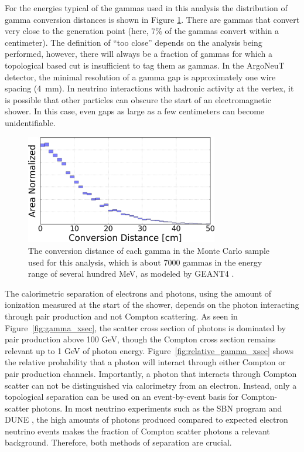 For the energies typical of the gammas used in this analysis the distribution of gamma conversion distances is shown in Figure \ref{fig:photon_conversion_dist}.  There are gammas that convert very close to the generation point (here, 7\% of the gammas convert within a centimeter).  The definition of ``too close'' depends on the analysis being performed, however, there will always be a fraction of gammas for which a topological based cut is insufficient to tag them as gammas.  In the ArgoNeuT detector, the minimal resolution of a gamma gap is approximately one wire spacing (4~mm). In neutrino interactions with hadronic activity at the vertex, it is possible that other particles can obscure the start of an electromagnetic shower.  In this case, even gaps as large as a few centimeters can become unidentifiable.

\begin{figure}[h!]
  \centering
  \includegraphics[width=0.75\textwidth]{emshower_figures/photon_conversion_dist_trimmed.png}
  \caption[Photon Conversion Distance]{The conversion distance of each gamma in the Monte Carlo sample used for this analysis, which is about 7000 gammas in the energy range of several hundred MeV, as modeled by GEANT4 \cite{Agostinelli:2002hh}.}
  \label{fig:photon_conversion_dist}
\end{figure}

The calorimetric separation of electrons and photons, using the amount of ionization measured at the start of the shower, depends on the photon interacting through pair production and not Compton scattering.  As seen in Figure~\ref{fig:gamma_xsec}, the scatter cross section of photons is dominated by pair production above 100 GeV, though the Compton cross section remains relevant up to 1 GeV of photon energy.  Figure~\ref{fig:relative_gamma_xsec} shows the relative probability that a photon will interact through either Compton or pair production channels.  Importantly, a photon that interacts through Compton scatter can not be distinguished via calorimetry from an electron.  Instead, only a topological separation can be used on an event-by-event basis for Compton-scatter photons.  In most neutrino experiments such as the SBN program \cite{Antonello:2015lea} and DUNE \cite{DUNE}, the high amounts of photons produced compared to expected electron neutrino events makes the fraction of Compton scatter photons a relevant background.  Therefore, both methods of separation are crucial.

